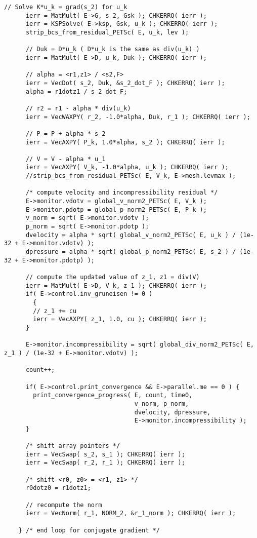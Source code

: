 \documentclass[10pt,letterpaper]{article}
\begin{document}
\begin{lstlisting}[frame=tb,mathescape,caption=Uzawa Algorithm]
      // Solve K*u_k = grad(s_2) for u_k
      ierr = MatMult( E->G, s_2, Gsk ); CHKERRQ( ierr );
      ierr = KSPSolve( E->ksp, Gsk, u_k ); CHKERRQ( ierr );
      strip_bcs_from_residual_PETSc( E, u_k, lev );

      // Duk = D*u_k ( D*u_k is the same as div(u_k) )
      ierr = MatMult( E->D, u_k, Duk ); CHKERRQ( ierr );

      // alpha = <r1,z1> / <s2,F>
      ierr = VecDot( s_2, Duk, &s_2_dot_F ); CHKERRQ( ierr );
      alpha = r1dotz1 / s_2_dot_F;

      // r2 = r1 - alpha * div(u_k)
      ierr = VecWAXPY( r_2, -1.0*alpha, Duk, r_1 ); CHKERRQ( ierr );

      // P = P + alpha * s_2
      ierr = VecAXPY( P_k, 1.0*alpha, s_2 ); CHKERRQ( ierr );
      
      // V = V - alpha * u_1
      ierr = VecAXPY( V_k, -1.0*alpha, u_k ); CHKERRQ( ierr );
      //strip_bcs_from_residual_PETSc( E, V_k, E->mesh.levmax );

      /* compute velocity and incompressibility residual */
      E->monitor.vdotv = global_v_norm2_PETSc( E, V_k );
      E->monitor.pdotp = global_p_norm2_PETSc( E, P_k );
      v_norm = sqrt( E->monitor.vdotv );
      p_norm = sqrt( E->monitor.pdotp );
      dvelocity = alpha * sqrt( global_v_norm2_PETSc( E, u_k ) / (1e-32 + E->monitor.vdotv) );
      dpressure = alpha * sqrt( global_p_norm2_PETSc( E, s_2 ) / (1e-32 + E->monitor.pdotp) );

      // compute the updated value of z_1, z1 = div(V) 
      ierr = MatMult( E->D, V_k, z_1 ); CHKERRQ( ierr );
      if( E->control.inv_gruneisen != 0 )
	    {
        // z_1 += cu
        ierr = VecAXPY( z_1, 1.0, cu ); CHKERRQ( ierr );
      }

      E->monitor.incompressibility = sqrt( global_div_norm2_PETSc( E, z_1 ) / (1e-32 + E->monitor.vdotv) );

      count++;

      if( E->control.print_convergence && E->parallel.me == 0 ) {
        print_convergence_progress( E, count, time0,
                                    v_norm, p_norm,
                                    dvelocity, dpressure,
                                    E->monitor.incompressibility );
      }

      /* shift array pointers */
      ierr = VecSwap( s_2, s_1 ); CHKERRQ( ierr );
      ierr = VecSwap( r_2, r_1 ); CHKERRQ( ierr );

      /* shift <r0, z0> = <r1, z1> */
      r0dotz0 = r1dotz1;

      // recompute the norm
      ierr = VecNorm( r_1, NORM_2, &r_1_norm ); CHKERRQ( ierr );

    } /* end loop for conjugate gradient */

\end{lstlisting}
\end{document}
